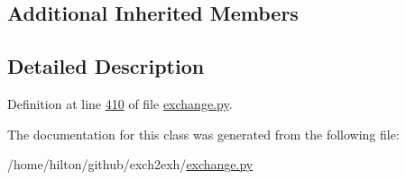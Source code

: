 \subsection*{Additional Inherited Members}


\subsection{Detailed Description}


Definition at line \hyperlink{exchange_8py_source_l00410}{410} of file \hyperlink{exchange_8py_source}{exchange.\+py}.



The documentation for this class was generated from the following file\+:\begin{DoxyCompactItemize}
\item 
/home/hilton/github/exch2exh/\hyperlink{exchange_8py}{exchange.\+py}\end{DoxyCompactItemize}
